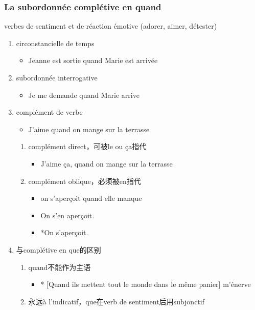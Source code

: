 \documentclass[UTF8]{report}
\begin{document}
\subsubsection{La subordonnée complétive en quand}
verbes de sentiment et de réaction émotive (adorer, aimer, détester)
\begin{enumerate}
    \item circonstancielle de temps
    \begin{itemize}
        \item Jeanne est sortie quand Marie est arrivée
    \end{itemize}
    \item subordonnée interrogative
    \begin{itemize}
        \item Je me demande quand Marie arrive
    \end{itemize}
    \item complément de verbe
    \begin{itemize}
        \item J’aime quand on mange sur la terrasse
    \end{itemize}
    \begin{enumerate}
        \item complément direct，可被le ou ça指代
        \begin{itemize}
            \item J’aime ça, quand on mange sur la terrasse
        \end{itemize}
        \item complément oblique，必须被en指代
        \begin{itemize}
            \item on s’aperçoit quand elle manque
            \item On s’en aperçoit.
            \item *On s’aperçoit.
        \end{itemize}
    \end{enumerate}
    \item 与complétive en que的区别
    \begin{enumerate}
        \item quand不能作为主语
        \begin{itemize}
            \item * [Quand ils mettent tout le monde dans le même panier] m’énerve
        \end{itemize}
        \item 永远à l’indicatif，que在verb de sentiment后用subjonctif

\end{enumerate}
\end{enumerate}
\end{document}
